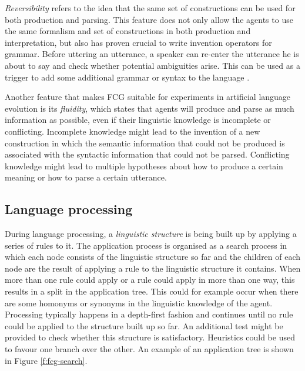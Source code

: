 \emph{Reversibility} refers to the idea that the same set of
constructions can be used for both production and parsing. This
feature does not only allow the agents to use the same formalism and
set of constructions in both production and interpretation, but also
has proven crucial to write invention operators for grammar. Before
uttering an utterance, a speaker can re-enter the utterance he is
about to say and check whether potential ambiguities arise. This can
be used as a trigger to add some additional grammar or syntax to the
language \citep{steels06how}.

Another feature that makes FCG suitable for experiments in artificial
language evolution is its \emph{fluidity}, which states that agents
will produce and parse as much information as possible, even if their
linguistic knowledge is incomplete or conflicting. Incomplete
knowledge might lead to the invention of a new construction in which
the semantic information that could not be produced is associated with
the syntactic information that could not be parsed. Conflicting
knowledge might lead to multiple hypotheses about how to produce a
certain meaning or how to parse a certain utterance.

\subsection{Language processing}

During language processing, a \emph{linguistic
  structure} is being built up by applying
a series of rules to it. The application process is organised as a
search process in which each node consists of the linguistic structure
so far and the children of each node are the result of applying a rule
to the linguistic structure it contains. When more than one rule could
apply or a rule could apply in more than one way, this results in a
split in the application tree. This could for example occur when there
are some homonyms or synonyms in the linguistic knowledge of the
agent. Processing typically happens in a depth-first fashion and
continues until no rule could be applied to the structure built up so
far. An additional test might be provided to check whether this
structure is satisfactory. Heuristics could be used to favour one
branch over the other. An example of an application tree is shown in
Figure \ref{f:fcg-search}.

